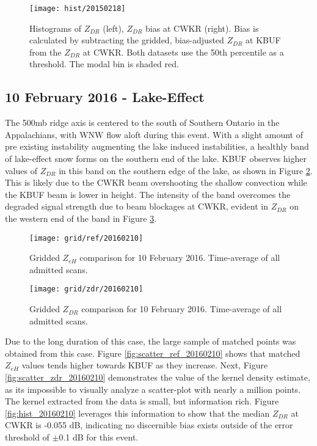 \begin{figure}[H]
\texttt{[image: hist/20150218]}\centering
\caption{Histograms of $Z_{DR}$ (left), $Z_{DR}$ bias at CWKR (right). Bias is calculated by subtracting the gridded, bias-adjusted $Z_{DR}$ at KBUF from the
$Z_{DR}$ at CWKR. Both datasets use the 50th percentile as a threshold. The modal bin is shaded red.} 
\label{fig:hist_20150218}
\end{figure}

\subsection{10 February 2016 - Lake-Effect}
The 500mb ridge axis is centered to the south of Southern Ontario in the Appalachians, with WNW flow aloft during this event. With a slight amount of pre
existing instability augmenting the lake induced instabilities, a healthly band of lake-effect snow forms on the southern end of the lake. KBUF observes
higher values of $Z_{DR}$ in this band on the southern edge of the lake, as shown in Figure \ref{fig:grid_ref_20160210}. This is likely due to the CWKR beam
overshooting the shallow convection while the KBUF beam is lower in height. The intensity of the band overcomes the degraded signal strength due to beam
blockages at CWKR, evident in $Z_{DR}$ on the western end of the band in Figure \ref{fig:grid_zdr_20160210}. 
\begin{figure}[H]
\texttt{[image: grid/ref/20160210]}
\caption{Gridded $Z_{eH}$ comparison for 10 February 2016. Time-average of all admitted scans.} 
\label{fig:grid_ref_20160210}
\end{figure}

\begin{figure}[H]
\texttt{[image: grid/zdr/20160210]}
\caption{Gridded $Z_{DR}$ comparison for 10 February 2016. Time-average of all admitted scans.} 
\label{fig:grid_zdr_20160210}
\end{figure}

\vspace{5mm}

Due to the long duration of this case, the large
sample of matched points was obtained from this case. Figure \ref{fig:scatter_ref_20160210} shows that matched $Z_{eH}$ values tends higher towards KBUF as
they increase. Next, Figure \ref{fig:scatter_zdr_20160210} demonstrates the value of the kernel density estimate, as its impossible to visually analyze a
scatter-plot with nearly a million points. The kernel extracted from the data is small, but information rich. Figure \ref{fig:hist_20160210} leverages this
information to show that the median $Z_{DR}$ at CWKR is -0.055 dB, indicating no discernible bias exists outside of the error threshold of $\pm$0.1 dB for
this event.

